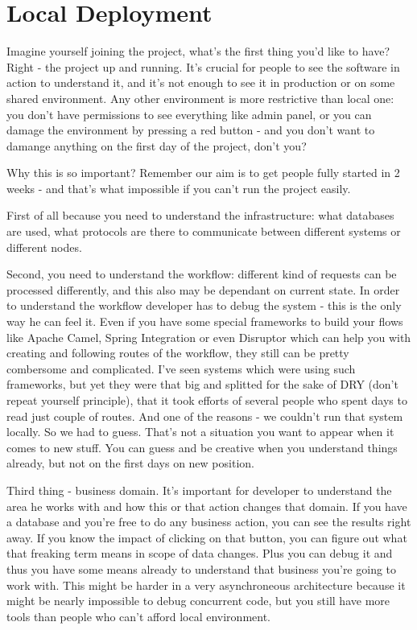 \section{Local Deployment}
Imagine yourself joining the project, what's the first thing you'd like to have? Right - the project up and running. It's crucial for people to see the software in action to understand it, and it's not enough to see it in production or on some shared environment. Any other environment is more restrictive than local one: you don't have permissions to see everything like admin panel, or you can damage the environment by pressing a red button - and you don't want to damange anything on the first day of the project, don't you?

Why this is so important? Remember our aim is to get people fully started in 2 weeks - and that's what impossible if you can't run the project easily. 

First of all because you need to understand the infrastructure: what databases are used, what protocols are there to communicate between different systems or different nodes. 

Second, you need to understand the workflow: different kind of requests can be processed differently, and this also may be dependant on current state. In order to understand the workflow developer has to debug the system - this is the only way he can feel it. Even if you have some special frameworks to build your flows like Apache Camel, Spring Integration or even Disruptor which can help you with creating and following routes of the workflow, they still can be pretty combersome and complicated. I've seen systems which were using such frameworks, but yet they were that big and splitted for the sake of DRY (don't repeat yourself principle), that it took efforts of several people who spent days to read just couple of routes. And one of the reasons - we couldn't run that system locally. So we had to guess. That's not a situation you want to appear when it comes to new stuff. You can guess and be creative when you understand things already, but not on the first days on new position.

Third thing - business domain. It's important for developer to understand the area he works with and how this or that action changes that domain. If you have a database and you're free to do any business action, you can see the results right away. If you know the impact of clicking on that button, you can figure out what that freaking term means in scope of data changes. Plus you can debug it and thus you have some means already to understand that business you're going to work with. This might be harder in a very asynchroneous architecture because it might be nearly impossible to debug concurrent code, but you still have more tools than people who can't afford local environment.

